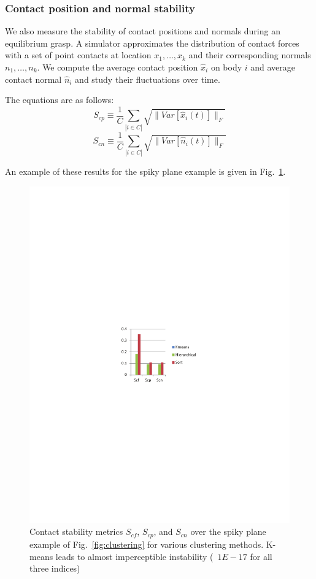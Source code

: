 \subsubsection{Contact position and normal stability}
We also measure the stability of contact positions and normals during an equilibrium grasp.  A simulator approximates the distribution of contact forces with a set of point contacts at location $x_1,\ldots,x_k$ and their corresponding normals $n_1,\ldots,n_k$.  We compute the average contact position $\hat{x}_i$ on body $i$ and average contact normal $\hat{n}_i$ and study their fluctuations over time.

The equations are as follows:
\begin{equation}
S_{cp} \equiv \frac{1}{C} \sum_{|i\in C|} \sqrt{\|Var[\hat{x}_i(t)]\|_F}
\end{equation}
\begin{equation}
S_{cn} \equiv \frac{1}{C} \sum_{|i\in C|} \sqrt{\|Var[\hat{n}_i(t)]\|_F}
\end{equation}

An example of these results for the spiky plane example is given in Fig.~\ref{fig:SpikyStability}.

\begin{figure}
\centering
\includegraphics[width=0.6\columnwidth]{images/ssoch/spiky_metrics.pdf}
\caption{Contact stability metrics $S_{cf}$, $S_{cp}$, and $S_{cn}$ over the spiky plane example of Fig.~\ref{fig:clustering} for various clustering methods. K-means leads to almost imperceptible instability (~$1E-17$ for all three indices)}
\label{fig:SpikyStability}
\end{figure}


